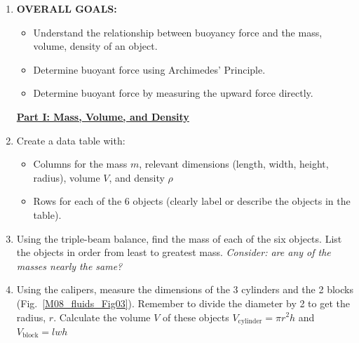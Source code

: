 \begin{enumerate}

\item \textbf{OVERALL GOALS:} 
\begin{itemize}
    \item Understand the relationship between buoyancy force and the mass, volume, density of an object.
    \item Determine buoyant force using Archimedes' Principle.
    \item Determine buoyant force by measuring the upward force directly.
\end{itemize}


\underline{\textbf{Part I: Mass, Volume, and Density}}

\item Create a data table with:
\begin{itemize}
    \item Columns for the mass $m$, relevant dimensions (length, width, height, radius), volume $V$, and density $\rho$
    \item Rows for each of the 6 objects (clearly label or describe the objects in the table).
\end{itemize} 

\item Using the triple-beam balance, find the mass of each of the six objects. List the objects in order from least to greatest mass. \textit{Consider: are any of the masses nearly the same?}

\item Using the calipers, measure the dimensions of the 3 cylinders and the 2 blocks (Fig.~\ref{M08_fluids_Fig03}). Remember to divide the diameter by 2 to get the radius, $r$. Calculate the volume $V$ of these objects %
$V_\text{cylinder} = \pi r^2 h$ and $V_\text{block} = lwh$


\end{enumerate}
